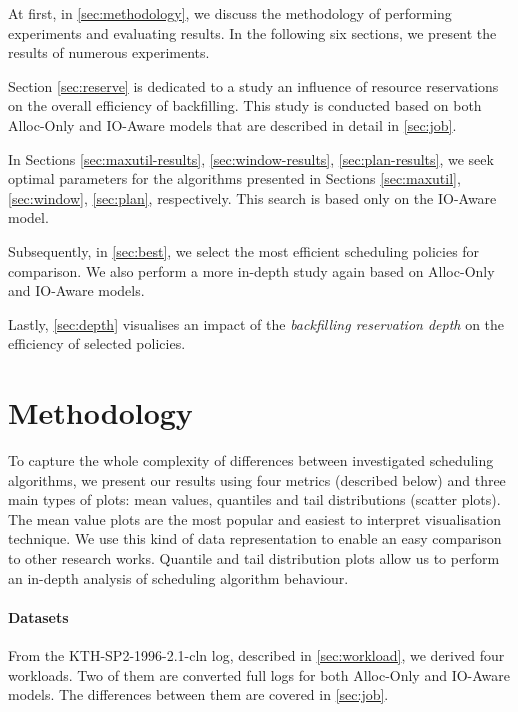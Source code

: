 \documentclass[thesis-en.tex]{subfiles}
\begin{document}
At first, in \autoref{sec:methodology}, we discuss the methodology of performing experiments and evaluating results. In the following six sections, we present the results of numerous experiments. 

Section \ref{sec:reserve} is dedicated to a study an influence of resource reservations on the overall efficiency of backfilling. This study is conducted based on both Alloc-Only and IO-Aware models that are described in detail in \autoref{sec:job}.

In Sections \ref{sec:maxutil-results}, \ref{sec:window-results}, \ref{sec:plan-results}, we seek optimal parameters for the algorithms presented in Sections \ref{sec:maxutil}, \ref{sec:window}, \ref{sec:plan}, respectively. This search is based only on the IO-Aware model.

Subsequently, in \autoref{sec:best}, we select the most efficient scheduling policies for comparison. We also perform a more in-depth study again based on Alloc-Only and IO-Aware models.

Lastly, \autoref{sec:depth} visualises an impact of the \emph{backfilling reservation depth} on the efficiency of selected policies.

\section{Methodology} \label{sec:methodology}
To capture the whole complexity of differences between investigated scheduling algorithms, we present our results using four metrics (described below) and three main types of plots: mean values, quantiles and tail distributions (scatter plots). The mean value plots are the most popular and easiest to interpret visualisation technique. We use this kind of data representation to enable an easy comparison to other research works. Quantile and tail distribution plots allow us to perform an in-depth analysis of scheduling algorithm behaviour.

\paragraph{Datasets}
From the KTH-SP2-1996-2.1-cln log, described in \autoref{sec:workload}, we derived four workloads. Two of them are converted full logs for both Alloc-Only and IO-Aware models. The differences between them are covered in \autoref{sec:job}.
\end{document}
